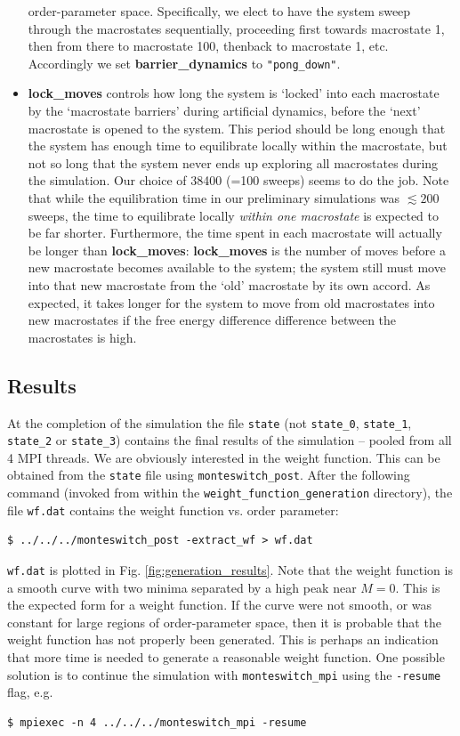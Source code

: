 \documentclass{report}
\begin{document}
\begin{itemize}
  order-parameter space. Specifically, we elect to have the system sweep through the macrostates sequentially, proceeding first towards macrostate 1, 
  then from there to macrostate 100, thenback to macrostate 1, etc. Accordingly we set \textbf{barrier\_dynamics} to \verb|"pong_down"|.
\item \textbf{lock\_moves} controls how long the system is `locked' into each macrostate by the `macrostate barriers' during artificial dynamics, 
  before the `next' macrostate is opened to the system. This period should be long enough that the system has enough time to equilibrate locally within the 
  macrostate, but not so long that the system never ends up exploring all macrostates during the simulation. Our choice of 38400 (=100 sweeps) seems 
  to do the job. Note that while the equilibration time in our preliminary simulations was $\lesssim 200$ sweeps, the time to equilibrate locally
  \emph{within one macrostate} is expected to be far shorter. Furthermore, the time spent in each macrostate will actually be longer than 
  \textbf{lock\_moves}: \textbf{lock\_moves} is the number of moves before a new macrostate becomes available to the system; the system still must 
  move into that new macrostate from the `old' macrostate by its own accord. As expected, it takes longer for the system to move from old macrostates 
  into new macrostates if the free energy difference difference between the macrostates is high.
\end{itemize}

\subsection{Results}
At the completion of the simulation the file \texttt{state} (not \texttt{state\_0}, \texttt{state\_1}, \texttt{state\_2} or \texttt{state\_3}) 
contains the final results of the simulation --
pooled from all 4 MPI threads. We are obviously interested in the weight function. This can be obtained from the \texttt{state} file using 
\texttt{monteswitch\_post}.
After the following command (invoked from within the \texttt{weight\_function\_generation} directory), the file \texttt{wf.dat} contains the weight 
function vs. order parameter:
\begin{verbatim}
$ ../../../monteswitch_post -extract_wf > wf.dat
\end{verbatim}
\texttt{wf.dat} is plotted in Fig. \ref{fig:generation_results}. Note that the weight function is a smooth curve with two minima separated by a high peak 
near $M=0$. This is the expected form for a weight function. If the curve were not smooth, or was constant for large regions of order-parameter space, then 
it is probable that the weight function has not properly been generated. This is perhaps an indication that more time is needed to generate a 
reasonable weight function. One possible solution is to continue the simulation with \texttt{monteswitch\_mpi} using the \texttt{-resume} flag, e.g.
\begin{verbatim}
$ mpiexec -n 4 ../../../monteswitch_mpi -resume
\end{verbatim}
\end{document}
